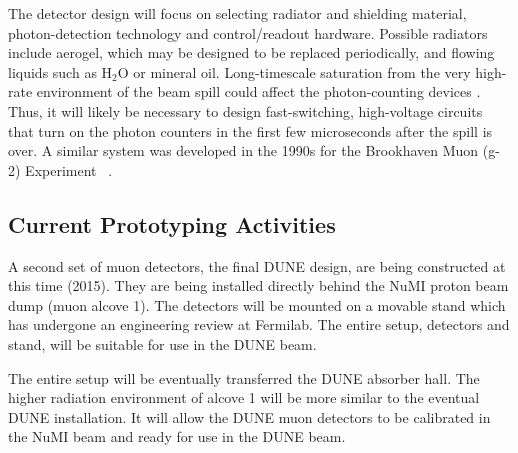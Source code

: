 The detector design will focus on selecting radiator and shielding
material, photon-detection technology and control/readout
hardware. Possible radiators include aerogel, which may be designed to
be replaced periodically, and flowing liquids such as H$_2$O or
mineral oil. Long-timescale saturation from the very high-rate
environment of the beam spill could affect the photon-counting devices
\cite{ref:HighRateCounting}. Thus, it will likely be necessary to
design fast-switching, high-voltage circuits that turn on the photon
counters in the first few microseconds after the spill is over. A
similar system was developed in the 1990s for the Brookhaven Muon
(g-2) Experiment~\cite{ref:G2} .

\subsection{Current Prototyping Activities}

A second set of muon detectors, the final DUNE design, are being constructed at this time (2015). They are being installed directly behind the NuMI proton beam dump (muon alcove 1). The detectors will be mounted on a movable stand which has undergone an engineering review at Fermilab. The entire setup, detectors and stand, will be suitable for use in the DUNE beam.

The entire setup will be eventually transferred the DUNE absorber hall. The higher radiation environment of alcove 1 will be more similar to the eventual DUNE installation. It will allow the DUNE muon detectors to be calibrated in the NuMI beam and ready for use in the DUNE beam.


